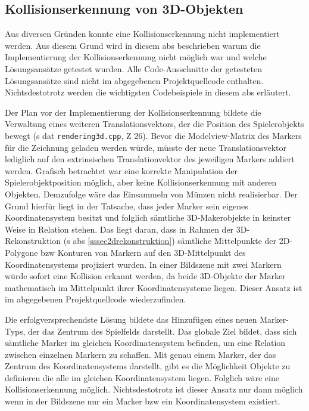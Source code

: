 \subsection{Kollisionserkennung von 3D-Objekten}\label{kollitionerkennungnnnn}
Aus diversen Gründen konnte eine Kollisionserkennung nicht implementiert werden. Aus diesem Grund wird in diesem \acs{abs} beschrieben warum die Implementierung der Kollisionserkennung nicht möglich war und welche Lösungsansätze getestet wurden. Alle Code-Ausschnitte der getesteten Lösungsansätze sind nicht im abgegebenen Projektquellcode enthalten. Nichtsdestotrotz werden die wichtigsten Codebeispiele in diesem \acs{abs} erläutert.

Der Plan vor der Implementierung der Kollisionserkennung bildete die Verwaltung eines weiteren Translationsvektors, der die Position des Spielerobjekts bewegt (\acs{s} \acs{dat} \texttt{rendering3d.cpp}, \acs{Z} 26). Bevor die Modelview-Matrix des Markers für die Zeichnung geladen werden würde, müsste der neue Translationsvektor lediglich auf den extrinsischen Translationvektor des jeweiligen Markers addiert werden. Grafisch betrachtet war eine korrekte Manipulation der Spielerobjektposition möglich, aber keine Kollisionserkennung mit anderen Objekten. Demzufolge wäre das Einsammeln von Münzen nicht realisierbar. Der Grund hierfür liegt in der Tatsache, dass jeder Marker sein eigenes Koordinatensystem besitzt und folglich sämtliche 3D-Makerobjekte in keinster Weise in Relation stehen. Das liegt daran, dass in Rahmen der 3D-Rekonstruktion (\acs{s} \acs{abs} \ref{sssec2drekonstruktion}) sämtliche Mittelpunkte der 2D-Polygone \acs{bzw} Konturen von Markern auf den 3D-Mittelpunkt des Koordinatensystems projiziert wurden. In einer Bildszene mit zwei Markern würde sofort eine Kollision erkannt werden, da beide 3D-Objekte der Marker mathematisch im Mittelpunkt ihrer Koordinatensysteme liegen. Dieser Ansatz ist im abgegebenen Projektquellcode wiederzufinden.

Die erfolgversprechendste Lösung bildete das Hinzufügen eines neuen Marker-Typs, der das Zentrum des Spielfelds darstellt. Das globale Ziel bildet, dass sich sämtliche Marker im gleichen Koordinatensystem befinden, um eine Relation zwischen einzelnen Markern zu schaffen. Mit genau einem Marker, der das Zentrum des Koordinatensystems darstellt, gibt es die Möglichkeit Objekte zu definieren die alle im gleichen Koordinatensystem liegen. Folglich wäre eine Kollisionserkennung möglich. Nichtsdestotrotz ist dieser Ansatz nur dann möglich wenn in der Bildszene nur ein Marker \acs{bzw} ein Koordinatensystem existiert.

